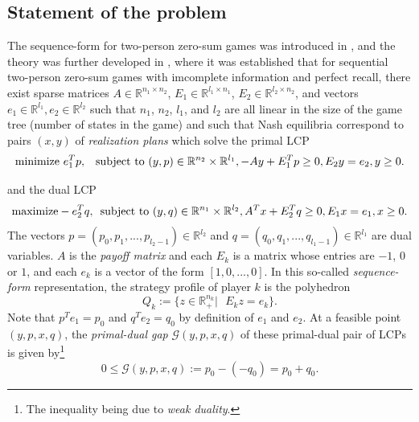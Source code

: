 \documentclass{article} %
\begin{document}
\subsection{Statement of the problem}
The sequence-form for two-person zero-sum games was introduced in
\cite{koller1992complexity}, and the theory was further developed in
\cite{koller1994fast,von1996efficient,vonequilibrium}, where it was
established that for sequential two-person zero-sum games with
imcomplete information and perfect recall, there exist sparse matrices
$A \in \mathbb{R}^{n_1
  \times n_2}$, $E_1 \in \mathbb{R}^{l_1 \times n_1}$, $E_2 \in
\mathbb{R}^{l_2 \times n_2}$, and vectors $e_1 \in \mathbb{R}^{l_1},
e_2 \in \mathbb{R}^{l_2}$ such that $n_1$, $n_2$, $l_1$, and $l_2$ are
all linear in the size of the game tree (number of states in the game)
and such that Nash equilibria correspond to pairs $(x, y)$ of
\textit{realization plans} which solve the primal LCP
\begin{equation}
  \begin{aligned}
     \text{minimize }e_1^Tp, \hspace{.5em}\text{ subject to }(y,p) \in
     \mathbb{R}^{n_2} \times \mathbb{R}^{l_1}, -Ay +
    E_1^Tp \geq 0, E_2y = e_2, y \ge 0.
  \end{aligned}
  \label{eq:primal_pb}
\end{equation}

and the dual LCP
\begin{equation}
  \begin{aligned}
    \text{maximize}-e_2^Tq,\hspace{.5em}\text{subject to }(y,q) \in
    \mathbb{R}^{n_1} \times \mathbb{R}^{l_2}, A^Tx + E_2^Tq \geq 0,
    E_1x = e_1, x \ge 0.
  \end{aligned}
  \label{eq:dual_pb}
\end{equation}
The vectors $p = (p_0, p_1, ..., p_{l_2 - 1}) \in \mathbb{R}^{l_2}$
and $q = (q_0, q_1, ..., q_{l_1 - 1}) \in \mathbb{R}^{l_1}$ are dual
variables. 
$A$ is the \textit{payoff matrix} and each $E_k$ is a matrix whose
entries are $-1$, $0$ or $1$, and each $e_k$ is a vector of the form
$[1, 0, ..., 0]$. In this so-called \textit{sequence-form}
representation, the strategy profile of player $k$ is the polyhedron
\begin{equation}
  Q_k := \{z \in \mathbb{R}^{n_k}_+ |\text{ }E_kz = e_k\}.
\label{eq:polyhedron}
\end{equation}
Note that $p^Te_1 = p_0$ and $q^Te_2 = q_0$ by definition of $e_1$ and
$e_2$. At a feasible point $(y, p, x, q)$, the \textit{primal-dual gap}
$\mathcal{G}(y, p, x, q)$ of these primal-dual pair of LCPs is given
by\footnote{The inequality being due to \textit{weak duality}.}
\begin{equation}
  0 \le \mathcal{G}(y, p, x, q) := p_0 - (-q_0) = p_0 + q_0.
  \label{eq:dgap}
\end{equation}
\end{document}

